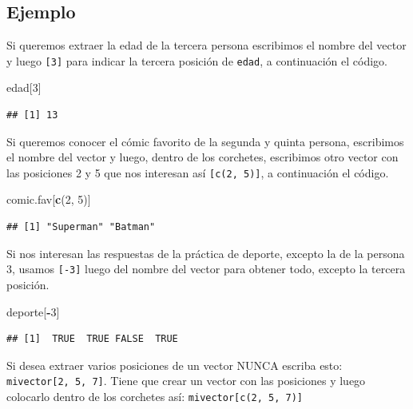 \documentclass[10pt,]{krantz}
\makeatletter
\newenvironment{Shaded}{\begin{snugshade}}{\end{snugshade}}
\newcommand{\KeywordTok}[1]{\textcolor[rgb]{0.13,0.29,0.53}{\textbf{#1}}}
\newcommand{\DecValTok}[1]{\textcolor[rgb]{0.00,0.00,0.81}{#1}}
\newcommand{\OperatorTok}[1]{\textcolor[rgb]{0.81,0.36,0.00}{\textbf{#1}}}
\newcommand{\NormalTok}[1]{#1}
\newenvironment{kframe}{%
\medskip{}
\setlength{\fboxsep}{.8em}
 \def\at@end@of@kframe{}%
 \ifinner\ifhmode%
  \def\at@end@of@kframe{\end{minipage}}%
  \begin{minipage}{\columnwidth}%
 \fi\fi%
 \def\FrameCommand##1{\hskip\@totalleftmargin \hskip-\fboxsep
 \colorbox{shadecolor}{##1}\hskip-\fboxsep
     \hskip-\linewidth \hskip-\@totalleftmargin \hskip\columnwidth}%
 \MakeFramed {\advance\hsize-\width
   \@totalleftmargin\z@ \linewidth\hsize
   \@setminipage}}%
 {\par\unskip\endMakeFramed%
 \at@end@of@kframe}
\renewenvironment{Shaded}{\begin{kframe}}{\end{kframe}}
\let\BeginKnitrBlock\begin \let\EndKnitrBlock\end
\makeatother
\begin{document}
\subsection*{Ejemplo}\label{ejemplo}


Si queremos extraer la edad de la tercera persona escribimos el nombre
del vector y luego \texttt{{[}3{]}} para indicar la tercera posición de
\texttt{edad}, a continuación el código.

\begin{Shaded}
\begin{Highlighting}[]
\NormalTok{edad[}\DecValTok{3}\NormalTok{]}
\end{Highlighting}
\end{Shaded}

\begin{verbatim}
## [1] 13
\end{verbatim}

Si queremos conocer el cómic favorito de la segunda y quinta persona,
escribimos el nombre del vector y luego, dentro de los corchetes,
escribimos otro vector con las posiciones 2 y 5 que nos interesan así
\texttt{{[}c(2,\ 5){]}}, a continuación el código.

\begin{Shaded}
\begin{Highlighting}[]
\NormalTok{comic.fav[}\KeywordTok{c}\NormalTok{(}\DecValTok{2}\NormalTok{, }\DecValTok{5}\NormalTok{)]}
\end{Highlighting}
\end{Shaded}

\begin{verbatim}
## [1] "Superman" "Batman"
\end{verbatim}

Si nos interesan las respuestas de la práctica de deporte, excepto la de
la persona 3, usamos \texttt{{[}-3{]}} luego del nombre del vector para
obtener todo, excepto la tercera posición.

\begin{Shaded}
\begin{Highlighting}[]
\NormalTok{deporte[}\OperatorTok{-}\DecValTok{3}\NormalTok{]}
\end{Highlighting}
\end{Shaded}

\begin{verbatim}
## [1]  TRUE  TRUE FALSE  TRUE
\end{verbatim}

\BeginKnitrBlock{rmdwarning}
Si desea extraer varios posiciones de un vector NUNCA escriba esto:
\texttt{mivector{[}2,\ 5,\ 7{]}}. Tiene que crear un vector con las
posiciones y luego colocarlo dentro de los corchetes así:
\texttt{mivector{[}c(2,\ 5,\ 7){]}}
\EndKnitrBlock{rmdwarning}
\end{document}
